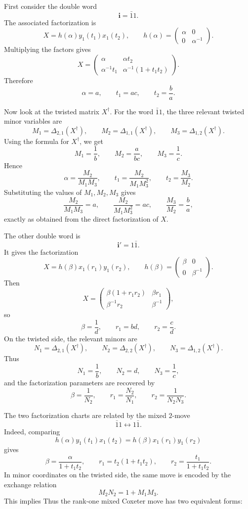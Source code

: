 \documentclass[12pt]{amsart}
\theoremstyle{plain}
\theoremstyle{definition}
\theoremstyle{remark}
\begin{document}
First consider the double word
\[
\mathbf i=\bar{1}1 .
\]
The associated factorization is
\[
X=h(\alpha)y_1(t_1)x_1(t_2),
\qquad
h(\alpha)=
\begin{pmatrix}
\alpha&0\\
0&\alpha^{-1}
\end{pmatrix}.
\]
Multiplying the factors gives
\[
X=
\begin{pmatrix}
\alpha&\alpha t_2\\
\alpha^{-1}t_1&\alpha^{-1}(1+t_1t_2)
\end{pmatrix}.
\]
Therefore
\[
\alpha=a,
\qquad
t_1=ac,
\qquad
t_2=\frac{b}{a}.
\]

Now look at the twisted matrix $X^\dagger$.  For the word $\bar{1}1$, the three relevant
twisted minor variables are
\[
M_1=\Delta_{2,1}(X^\dagger),\qquad
M_2=\Delta_{1,1}(X^\dagger),\qquad
M_3=\Delta_{1,2}(X^\dagger).
\]
Using the formula for $X^\dagger$, we get
\[
M_1=\frac{1}{b},
\qquad
M_2=\frac{a}{bc},
\qquad
M_3=\frac{1}{c}.
\]
Hence
\[
\alpha=\frac{M_2}{M_1M_3},
\qquad
t_1=\frac{M_2}{M_1M_3^2},
\qquad
t_2=\frac{M_3}{M_2}.
\]
Substituting the values of $M_1,M_2,M_3$ gives
\[
\frac{M_2}{M_1M_3}=a,\qquad
\frac{M_2}{M_1M_3^2}=ac,\qquad
\frac{M_3}{M_2}=\frac{b}{a},
\]
exactly as obtained from the direct factorization of $X$.

The other double word is
\[
\mathbf i'=1\bar{1}.
\]
It gives the factorization
\[
X=h(\beta)x_1(r_1)y_1(r_2),
\qquad
h(\beta)=
\begin{pmatrix}
\beta&0\\
0&\beta^{-1}
\end{pmatrix}.
\]
Then
\[
X=
\begin{pmatrix}
\beta(1+r_1r_2)&\beta r_1\\
\beta^{-1}r_2&\beta^{-1}
\end{pmatrix},
\]
so
\[
\beta=\frac{1}{d},
\qquad
r_1=bd,
\qquad
r_2=\frac{c}{d}.
\]
On the twisted side, the relevant minors are
\[
N_1=\Delta_{2,1}(X^\dagger),\qquad
N_2=\Delta_{2,2}(X^\dagger),\qquad
N_3=\Delta_{1,2}(X^\dagger).
\]
Thus
\[
N_1=\frac{1}{b},
\qquad
N_2=d,
\qquad
N_3=\frac{1}{c},
\]
and the factorization parameters are recovered by
\[
\beta=\frac{1}{N_2},
\qquad
r_1=\frac{N_2}{N_1},
\qquad
r_2=\frac{1}{N_2N_3}.
\]

The two factorization charts are related by the mixed $2$-move
\[
\bar{1}1 \longleftrightarrow 1\bar{1}.
\]
Indeed, comparing
\[
h(\alpha)y_1(t_1)x_1(t_2)
=
h(\beta)x_1(r_1)y_1(r_2)
\]
gives
\[
\beta=\frac{\alpha}{1+t_1t_2},
\qquad
r_1=t_2(1+t_1t_2),
\qquad
r_2=\frac{t_1}{1+t_1t_2}.
\]
In minor coordinates on the twisted side, the same move is encoded by the exchange
relation
\[
M_2N_2=1+M_1M_3.
\]
This implies 
Thus the rank-one mixed Coxeter move has two equivalent forms:
\end{document}
